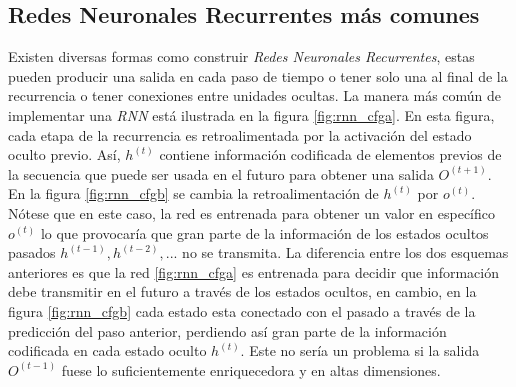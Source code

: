 \subsection{Redes Neuronales Recurrentes más comunes}

Existen diversas formas como construir \textit{Redes Neuronales Recurrentes}, estas pueden producir una
salida en cada paso de tiempo o tener solo una al final de la recurrencia  o tener
conexiones entre unidades ocultas. La manera más común de implementar una \textit{RNN} está ilustrada en la
figura \ref{fig:rnn_cfga}. En esta figura, cada etapa de la recurrencia es retroalimentada por la
activación del estado oculto previo. Así, $h^{(t)}$ contiene información codificada de elementos
previos de la secuencia que puede ser usada en el futuro para obtener una salida $O^{(t+1)}$. En la
figura \ref{fig:rnn_cfgb} se
cambia la retroalimentación de $h^{(t)}$ por $o^{(t)}$. Nótese que en este caso, la red es entrenada
para obtener un valor en específico $o^{(t)}$ lo que provocaría que gran parte de la información de
los estados ocultos pasados $h^{(t-1)}, h^{(t-2)}, ...$ no se transmita.
La diferencia entre los dos esquemas anteriores es que
la red \ref{fig:rnn_cfga} es entrenada para decidir que información debe transmitir en el futuro a través
de los estados ocultos, en cambio, en la figura \ref{fig:rnn_cfgb} cada estado esta conectado con el
pasado a través de la predicción del paso anterior, perdiendo así gran parte de la información
codificada en cada estado oculto $h^{(t)}$. Este no sería un problema si la salida $O^{(t-1)}$ fuese
lo suficientemente enriquecedora y en altas dimensiones.


